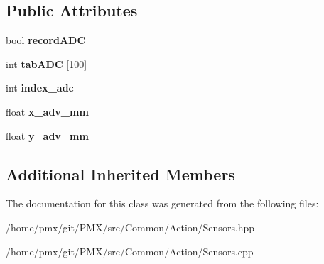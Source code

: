 \subsection*{Public Attributes}
\begin{DoxyCompactItemize}
\item 
\mbox{\label{classSensors_a978ddba69899cbb82391635fb1fcfbdc}} 
bool {\bfseries record\+A\+DC}
\item 
\mbox{\label{classSensors_abde8e6b8863e358d2024edab6b035324}} 
int {\bfseries tab\+A\+DC} \mbox{[}100\mbox{]}
\item 
\mbox{\label{classSensors_a37e3002a562cbded424b9971f93a4efb}} 
int {\bfseries index\+\_\+adc}
\item 
\mbox{\label{classSensors_a683c6e1ce6a71c12fcafb83a5c03ab89}} 
float {\bfseries x\+\_\+adv\+\_\+mm}
\item 
\mbox{\label{classSensors_a24d2007a2e760fa63ebf01f3e57f4b55}} 
float {\bfseries y\+\_\+adv\+\_\+mm}
\end{DoxyCompactItemize}
\subsection*{Additional Inherited Members}


The documentation for this class was generated from the following files\+:\begin{DoxyCompactItemize}
\item 
/home/pmx/git/\+P\+M\+X/src/\+Common/\+Action/Sensors.\+hpp\item 
/home/pmx/git/\+P\+M\+X/src/\+Common/\+Action/Sensors.\+cpp\end{DoxyCompactItemize}
